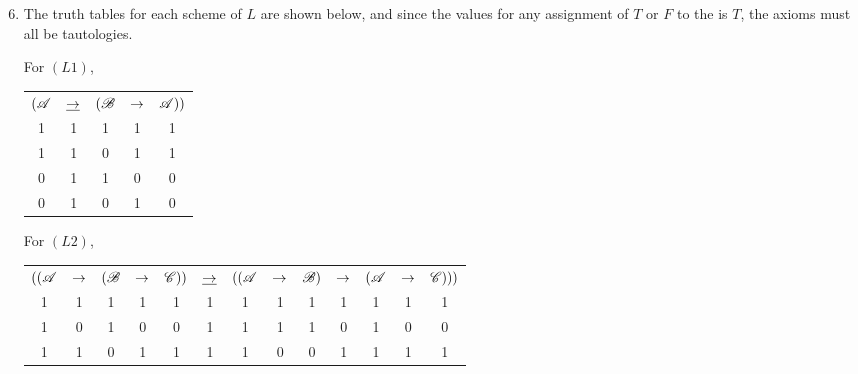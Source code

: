 \begin{enumerate}
  \setcounter{enumi}{5}
  \item %
    The truth tables for each scheme of \(L\) are shown below, and since the values for any assignment of \(T\) or \(F\) to the \wfs{} is \(T\), the axioms must all be tautologies.

    For \((L1)\),
    \begin{center}
      \begin{tabular}{ccccc}
        \((\mathscr{A}\)&
        \(\underline{\rightarrow}\)&
        \((\mathscr{B}\)&
        \(\rightarrow\)&
        \(\mathscr{A}))\)\\

        1&
        1&
        1&
        1&
        1\\
        
        1&
        1&
        0&
        1&
        1\\

        0&
        1&
        1&
        0&
        0\\
        
        0&
        1&
        0&
        1&
        0
      \end{tabular}
    \end{center}

    For \((L2)\),
    \begin{center}
      \begin{tabular}{ccccccccccccc}
        \(((\mathscr{A}\)&
        \(\rightarrow\)&
        \((\mathscr{B}\)&
        \(\rightarrow\)&
        \(\mathscr{C}))\)&
        \(\underline{\rightarrow}\)&
        \(((\mathscr{A}\)&
        \(\rightarrow\)&
        \(\mathscr{B})\)&
        \(\rightarrow\)&
        \((\mathscr{A}\)&
        \(\rightarrow\)&
        \(\mathscr{C})))\)\\

        1& %
        1& %
        1& %
        1& %
        1& %
        1&
        1& %
        1& %
        1& %
        1& %
        1& %
        1& %
        1\\%

        1& %
        0& %
        1& %
        0& %
        0& %
        1&
        1& %
        1& %
        1& %
        0& %
        1& %
        0& %
        0\\%

        1& %
        1& %
        0& %
        1& %
        1& %
        1&
        1& %
        0& %
        0& %
        1& %
        1& %
        1& %
        1\\%


\end{tabular}
\end{center}
\end{enumerate}
